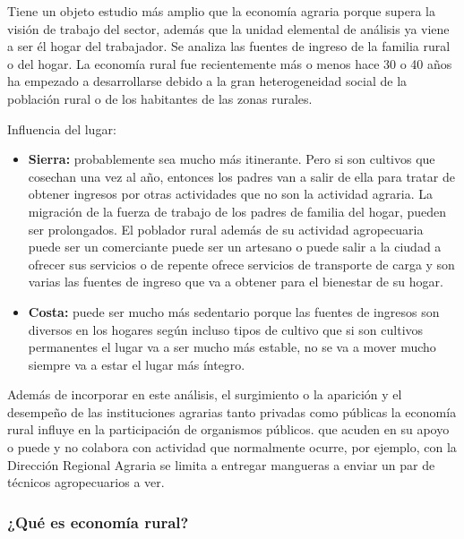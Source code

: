 \documentclass[
  a4paper,
]{article}
\begin{document}
Tiene un objeto estudio más amplio que la economía agraria porque supera
la visión de trabajo del sector, además que la unidad elemental de
análisis ya viene a ser él hogar del trabajador. Se analiza las fuentes
de ingreso de la familia rural o del hogar. La economía rural fue
recientemente más o menos hace 30 o 40 años ha empezado a desarrollarse
debido a la gran heterogeneidad social de la población rural o de los
habitantes de las zonas rurales.

Influencia del lugar:

\begin{itemize}
\item
  \textbf{Sierra:} probablemente sea mucho más itinerante. Pero si son
  cultivos que cosechan una vez al año, entonces los padres van a salir
  de ella para tratar de obtener ingresos por otras actividades que no
  son la actividad agraria. La migración de la fuerza de trabajo de los
  padres de familia del hogar, pueden ser prolongados. El poblador rural
  además de su actividad agropecuaria puede ser un comerciante puede ser
  un artesano o puede salir a la ciudad a ofrecer sus servicios o de
  repente ofrece servicios de transporte de carga y son varias las
  fuentes de ingreso que va a obtener para el bienestar de su hogar.
\item
  \textbf{Costa:} puede ser mucho más sedentario porque las fuentes de
  ingresos son diversos en los hogares según incluso tipos de cultivo
  que si son cultivos permanentes el lugar va a ser mucho más estable,
  no se va a mover mucho siempre va a estar el lugar más íntegro.
\end{itemize}

Además de incorporar en este análisis, el surgimiento o la aparición y
el desempeño de las instituciones agrarias tanto privadas como públicas
la economía rural influye en la participación de organismos públicos.
que acuden en su apoyo o puede y no colabora con actividad que
normalmente ocurre, por ejemplo, con la Dirección Regional Agraria se
limita a entregar mangueras a enviar un par de técnicos agropecuarios a
ver.

\hypertarget{quuxe9-es-economuxeda-rural}{%
\subsubsection{¿Qué es economía
rural?}\label{quuxe9-es-economuxeda-rural}}
\end{document}

